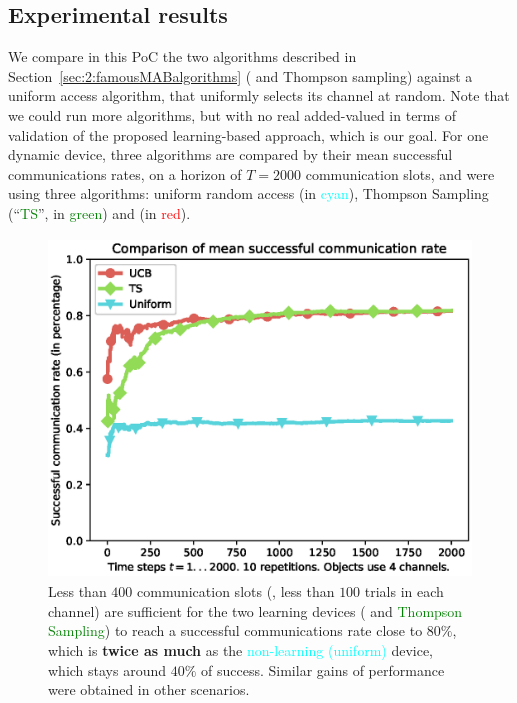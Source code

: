 \subsection{Experimental results}
\label{sub:42:results}
We compare in this PoC the two algorithms described in Section~\ref{sec:2:famousMABalgorithms} (\UCB{} and Thompson sampling) against a uniform access algorithm, that uniformly selects its channel at random.
Note that we could run more algorithms, but with no real added-valued in terms of validation of the proposed learning-based approach, which is our goal.
%
For one dynamic device, three algorithms are compared by their mean successful communications rates, on a horizon of $T=2000$ communication slots, and were using three algorithms: uniform random access (in \textcolor{cyan}{cyan}), Thompson Sampling (``\textcolor{green}{TS}'', in \textcolor{green}{green}) and \UCB{} (in \textcolor{red}{red}).

\begin{figure}[!h]
	\centering
    \includegraphics[height=9.0cm]{plot_datafile_append_Uniform_vs_UCB_vs_TS.eps}
    \caption[Less than $400$ communication slots (\ie, less than $100$ trials in each channel) are sufficient for the two learning devices (\UCB{} and Thompson Sampling) to reach a successful communications rate close to $80\%$, which is \textbf{twice as much} as the non-learning (uniform) device, which stays around $40\%$ of success. Similar gains of performance were obtained in other scenarios]{Less than $400$ communication slots (\ie, less than $100$ trials in each channel) are sufficient for the two learning devices (\textcolor{red}{\UCB} and \textcolor{green}{Thompson Sampling}) to reach a successful communications rate close to $80\%$, which is \textbf{twice as much} as the \textcolor{cyan}{non-learning (uniform)} device, which stays around $40\%$ of success. Similar gains of performance were obtained in other scenarios.}
    \label{fig:42:plot_datafile_append_Uniform_vs_UCB_vs_TS}
\end{figure}

